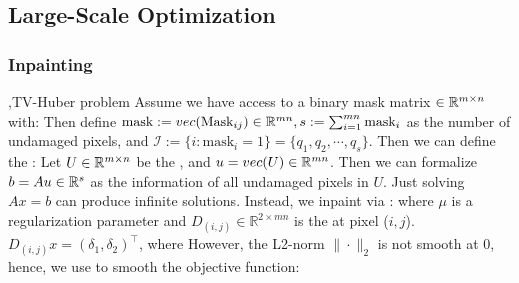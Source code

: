 \documentclass[12pt]{report}
\begin{document}
\subsection{Large-Scale Optimization}

\subsubsection{Inpainting}
\sep{TV-Huber problem}
Assume we have access to a binary mask matrix $\in \RR^{m\times n}$ with:
Then define $\text{mask}:=vec(\text{Mask}_{ij})\in\RR^{mn}, s:=\sum_{i=1}^{mn}\text{mask}_i$ as the number of undamaged pixels,
and $\mathcal{I}:=\{i:\mathrm{mask}_i=1\}=\{q_1,q_2,\cdots,q_s\}$. Then we can define the :
Let $U\in \RR^{m\times n}$ be the , and $u=vec(U)\in\RR^{mn}$. Then we can formalize $b=Au\in\RR^s$ as
the information of all undamaged pixels in $U$. Just solving $Ax=b$ can produce infinite solutions. Instead, we inpaint via :
where $\mu$ is a regularization parameter and $D_{(i,j)}\in\mathbb{R}^{2\times mn}$ is the  at pixel ($i,j$).
$D_{(i,j)}x=(\delta_1,\delta_2)^\top $, where
However, the L2-norm $\|\cdot\|_2$ is not smooth at $0$, hence, we use  to smooth the objective function:
\end{document}

